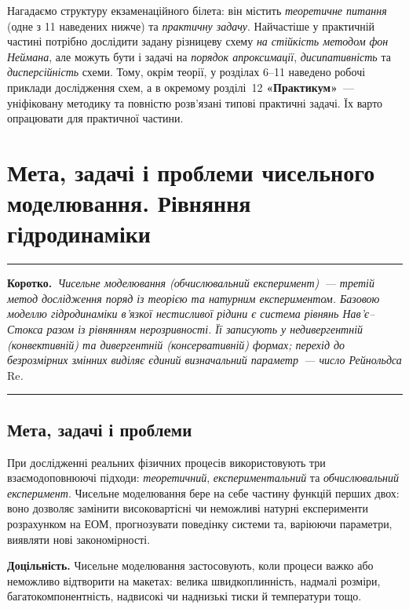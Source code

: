 \documentclass[12pt,a4paper]{article}
\theoremstyle{definition}
\theoremstyle{plain}
\newenvironment{korotko}
  {\par\medskip\noindent\begingroup\color{accent!75!black}\rule{\linewidth}{0.4pt}\par
   \noindent\textbf{Коротко.}\itshape\,}
  {\par\noindent\rule{\linewidth}{0.4pt}\endgroup\medskip}
\begin{document}
\medskip
\noindent
Нагадаємо структуру екзаменаційного білета: він містить
\emph{теоретичне питання} (одне з 11 наведених нижче) та
\emph{практичну задачу}. Найчастіше у практичній частині потрібно
дослідити задану різницеву схему \emph{на стійкість методом фон Неймана},
але можуть бути і задачі на \emph{порядок апроксимації},
\emph{дисипативність} та \emph{дисперсійність} схеми. Тому, окрім теорії,
у розділах 6--11 наведено робочі приклади дослідження схем, а в окремому
розділі~12 \textbf{«Практикум»}~--- уніфіковану методику та повністю
розв'язані типові практичні задачі. Їх варто опрацювати для практичної
частини.

\newpage

\section{Мета, задачі і проблеми чисельного моделювання. Рівняння гідродинаміки}

\begin{korotko}
Чисельне моделювання (обчислювальний експеримент)~--- третій метод
дослідження поряд із теорією та натурним експериментом. Базовою моделлю
гідродинаміки в'язкої нестисливої рідини є система рівнянь
Нав'є--Стокса разом із рівнянням нерозривності. Її записують у
\emph{недивергентній} (конвективній) та \emph{дивергентній}
(консервативній) формах; перехід до безрозмірних змінних виділяє єдиний
визначальний параметр~--- число Рейнольдса $\mathrm{Re}$.
\end{korotko}

\subsection{Мета, задачі і проблеми}
При дослідженні реальних фізичних процесів використовують три
взаємодоповнюючі підходи: \emph{теоретичний}, \emph{експериментальний}
та \emph{обчислювальний експеримент}. Чисельне моделювання бере на себе
частину функцій перших двох: воно дозволяє замінити високовартісні чи
неможливі натурні експерименти розрахунком на ЕОМ, прогнозувати
поведінку системи та, варіюючи параметри, виявляти нові
закономірності.

\smallskip\noindent\textbf{Доцільність.} Чисельне моделювання
застосовують, коли процеси важко або неможливо відтворити на макетах:
велика швидкоплинність, надмалі розміри, багатокомпонентність, надвисокі
чи наднизькі тиски й температури тощо.
\end{document}
